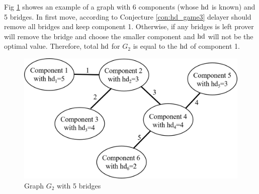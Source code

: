 \documentclass[12pt]{book}
\begin{document}
\begin{examp}\label{exp:hd5}
       Fig \ref{fig:hd5} showes an example of a graph with 6 components (whose $\operatorname{hd}$ is known) and 5 bridges. In first move,
	   according to Conjecture \ref{con:hd_game3} delayer should remove all bridges and keep component 1. Otherwise, if any bridges is 
	   left prover will remove the bridge and choose the smaller component and $\operatorname{hd}$ will not be the optimal value.
	   Therefore, total $\operatorname{hd}$ for $G_2$ is equal to the $\operatorname{hd}$ of component 1.	   

	  \begin{figure}
      \begin{center}
      \includegraphics[scale =0.65]{graph_with_bridges.png}
      \caption{Graph $G_2$ with 5 bridges}
	  \label{fig:hd5}
      \end{center}
      \end{figure}
\end{examp}
\end{document}
